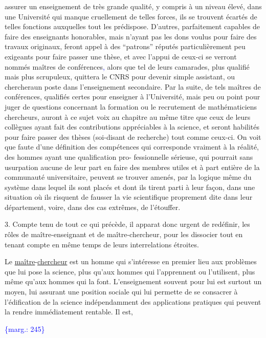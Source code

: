 \documentclass[11pt]{article}
\newcommand{\scanpage}[1]{\par\bigskip\noindent{\small\sffamily[scan #1]}\par}
\newcommand{\mspage}[1]{{\small\sffamily[p.\,#1]}}
\newcommand{\hand}[1]{\textcolor{blue}{#1}}
\let\over\relax
\newcommand{\over}[2]{\textcolor{gray}{#1}\textcolor{blue}{\ensuremath{^{\!\nearrow}}#2}}
\newcommand{\margin}[1]{\textcolor{blue}{\{\textsf{marg.:} #1\}}}
\newcommand{\uline}[1]{\underline{#1}}
\begin{document}
assurer un enseignement de très grande qualité, y compris à un niveau
élevé, dans une Université qui manque cruellement de telles forces, ils
se trouvent écartés de telles fonctions auxquelles tout les prédispose.
D'autres, parfaitement capables de faire des enseignants honorables, mais
n'ayant pas les dons voulus pour faire des travaux originaux, feront appel
à des ``patrons'' réputés particulièrement peu exigeants pour faire passer
une thèse, et avec l'appui de ceux-ci se verront nommés maîtres de conférences\hand{,}
alors que tel de leurs camarades, plus qualifié mais plus scrupuleux,
quittera le CNRS pour devenir simple assistant, ou chercheraun poste dans
l'enseignement secondaire. Par la suite, de tels maîtres de conférences,
qualifiés certes pour enseigner à l'Université, mais peu ou point pour juger
de questions concernant la formation ou le recrutement de mathématiciens
chercheurs, auront à ce sujet voix au chapitre au même titre que ceux de
leurs collègues ayant fait des contributions appréciables à la science, et
seront habilités pour faire passer des thèses (soi-disant de recherche)
tout comme ceux-ci. On voit que faute d'une définition des compétences qui
corresponde vraiment à la réalité, des hommes ayant une qualification pro-%
fessionnelle sérieuse, qui pourrait sans usurpation aucune de leur part en
faire des membres utiles et à part entière de la communauté universitaire,
peuvent se trouver amenés, par la logique même du système dans lequel ils
sont placés et dont ils tirent parti à leur façon, dans une situation où
ils risquent de fausser la vie scientifique proprement dite dans leur
département, voire, dans des cas extrêmes, de l'étouffer.

3. Compte tenu de tout ce qui précède, il appara\over{i}{î}t donc urgent de redéfinir,
les rôles de maître-enseignant et de maître-chercheur, pour les dissocier
tout en tenant compte en même temps de leurs interrelations étroites.

Le \uline{maître}-\uline{chercheur} est un homme qui s'intéresse en premier lieu
aux problèmes que lui pose la science, plus qu'aux hommes qui l'apprennent
ou l'utilisent, plus même qu'aux hommes qui la font. L'enseignement souvent
pour lui est surtout un moyen, lui assurant une position sociale qui lui
permette de se consacrer à l'édification de la science indépendamment des
applications pratiques qui peuvent la rendre immédiatement rentable. Il est,

\margin{245}

\clearpage
\scanpage{119/246}
\mspage{6}
\end{document}
